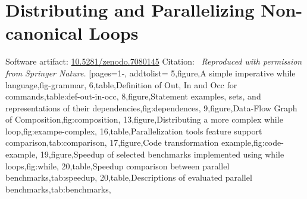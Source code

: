 \section{Distributing and Parallelizing Non-canonical Loops}
\label{app:sec:vmcai}
{\noindent Software artifact: \href{https://zenodo.org/records/7080145}{10.5281/zenodo.7080145}
\newline\noindent Citation:~\cite{aubert202213}
\newline\newline\textit{Reproduced with permission from Springer Nature.}}
[pages={1-}, addtolist={
    5,figure,A simple imperative while language,fig-grammar,
    6,table,{Definition of Out, In and Occ for commands},table:def-out-in-occ,
    8,figure,{Statement examples, sets, and representations of their dependencies},fig:dependences,
    9,figure,Data-Flow Graph of Composition,fig:composition,
    13,figure,Distributing a more complex while loop,fig:exampe-complex,
    16,table,Parallelization tools feature support comparison,tab:comparison,
    17,figure,Code transformation example,fig:code-example,
    19,figure,Speedup of selected benchmarks implemented using while loops,fig:while,
    20,table,Speedup comparison between parallel benchmarks,tab:speedup,
    20,table,Descriptions of evaluated parallel benchmarks,tab:benchmarks},
